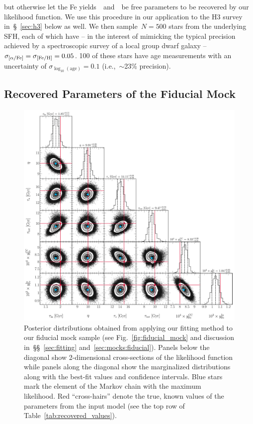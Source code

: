 \documentclass[foo.tex]{subfiles}
\begin{document}
but otherwise let the Fe yields~\yfecc~and~\yfeia~be free parameters to be
recovered by our likelihood function.
We use this procedure in our application to the H3 survey in~\S~\ref{sec:h3}
below as well.
We then sample~$N = 500$ stars from the underlying SFH, each of which have -- in
the interest of mimicking the typical precision achieved by a spectroscopic
survey of a local group dwarf galaxy --~$\sigma_{\text{[$\alpha$/Fe]}} = \sigma_{\text{[Fe/H]}} = 0.05$.
100 of these stars have age measurements with an uncertainty of
$\sigma_{\log_{10}(\text{age})} = 0.1$ (i.e.,~$\sim$23\% precision).

\subsection{Recovered Parameters of the Fiducial Mock}
\label{sec:mocks:recovered}

\begin{figure}
\centering
\includegraphics[scale = 0.44]{fiducial_512k.pdf}
\caption{
Posterior distributions obtained from applying our fitting method to our
fiducial mock sample (see Fig.~\ref{fig:fiducial_mock} and discussion
in~\S\S~\ref{sec:fitting} and~\ref{sec:mocks:fiducial}).
Panels below the diagonal show 2-dimensional cross-sections of the likelihood
function while panels along the diagonal show the marginalized distributions
along with the best-fit values and confidence intervals.
Blue stars mark the element of the Markov chain with the maximum likelihood.
Red ``cross-hairs'' denote the true, known values of the parameters from the
input model (see the top row of Table~\ref{tab:recovered_values}).
}
\label{fig:fiducial_mock_corner}
\end{figure}
\end{document}
